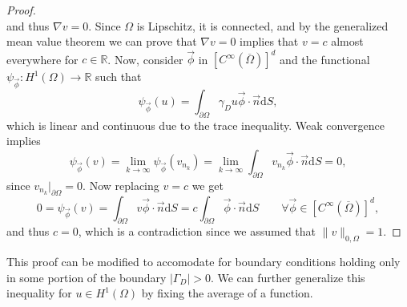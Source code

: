 \begin{lemma}
\begin{proof}
\begin{equation*}
    \end{equation*}
    and thus $\nabla v = 0$. Since $\Omega$ is Lipschitz, it is connected, and by the generalized mean value theorem we can prove that $\nabla v = 0$ implies that $v=c$ almost everywhere for $c\in \mathbb{R}$. Now, consider $\vec\phi$ in $[C^\infty(\overline{\Omega})]^d$ and the functional $\psi_{\vec{\phi}}:H^1(\Omega)\to \mathbb{R}$ such that 
    \begin{equation*}
        \psi_{\vec{\phi}}(u) = \int_{\partial\Omega} \gamma_D u \vec\phi\cdot\vec n \mathrm{d}S,
        \end{equation*}
    which is linear and continuous due to the trace inequality. Weak convergence implies
    \begin{equation*}
        \psi_{\vec{\phi}}(v) = \lim_{k\to\infty} \psi_{\vec{\phi}}(v_{n_k}) = \lim_{k\to\infty} \int_{\partial\Omega} v_{n_k} \vec\phi\cdot\vec n \mathrm{d}S = 0,
    \end{equation*}
    since  $v_{n_k}|_{\partial\Omega} = 0$. Now replacing $v=c$ we get
    \begin{equation*}
        0 = \psi_{\vec{\phi}}(v) = \int_{\partial\Omega} v\vec\phi \cdot\vec n\mathrm{d}S = c\int_{\partial\Omega} \vec\phi\cdot\vec n \mathrm{d}S \qquad \forall \vec\phi \in [C^\infty(\overline\Omega)]^d,
    \end{equation*}
    and thus $c=0$, which is a contradiction since we assumed that $\|v\|_{0,\Omega}=1$. 
    \end{proof}
\end{lemma}

This proof can be modified to accomodate for boundary conditions holding only in some portion of the boundary $|\Gamma_D|>0$. We can further generalize this inequality for $u\in H^1(\Omega)$ by fixing the average of a function. 

